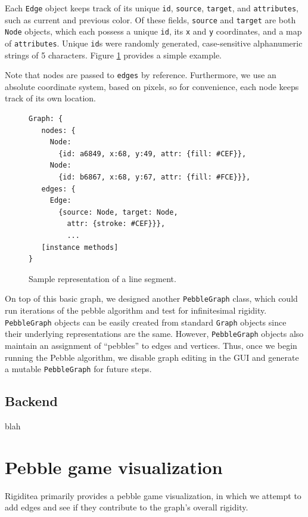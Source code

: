 \documentclass[aps,prd,final,twocolumn,letterpaper,nofootinbib]{revtex4-1}
\begin{document}
Each \texttt{Edge} object keeps track of its unique \texttt{id}, \texttt{source}, \texttt{target}, and \texttt{attributes},
such as current and previous color.
Of these fields, \texttt{source} and \texttt{target} are both \texttt{Node} objects,
which each possess a unique \texttt{id}, its \texttt{x} and \texttt{y} coordinates,
and a map of \texttt{attributes}.
Unique \texttt{id}s were randomly generated,
case-sensitive alphanumeric strings of 5 characters.
Figure \ref{fig:graphrep} provides a simple example.

Note that nodes are passed to \texttt{edges} by reference.
Furthermore, we use an absolute coordinate system,
based on pixels, so for convenience, each node keeps track of its own location.

\begin{figure}[ht]
\begin{verbatim}
Graph: {
   nodes: {
     Node:
       {id: a6849, x:68, y:49, attr: {fill: #CEF}},
     Node:
       {id: b6867, x:68, y:67, attr: {fill: #FCE}}},
   edges: {
     Edge:
       {source: Node, target: Node,
         attr: {stroke: #CEF}}},
         ...
   [instance methods]
}
\end{verbatim}
\caption{Sample representation of a line segment.}
\label{fig:graphrep}
\end{figure}

On top of this basic graph,
we designed another \texttt{PebbleGraph} class,
which could run iterations of the pebble algorithm
and test for infinitesimal rigidity.
\texttt{PebbleGraph} objects can be easily created
from standard \texttt{Graph} objects since
their underlying representations are the same.
However, \texttt{PebbleGraph} objects also maintain
an assignment of ``pebbles'' to edges and vertices.
Thus, once we begin running the Pebble algorithm,
we disable graph editing in the GUI and generate a mutable \texttt{PebbleGraph}
for future steps.
 
\subsection{Backend}
blah

\section{Pebble game visualization}
\label{sec:pebble}

Rigiditea primarily provides a pebble game visualization,
in which we attempt to add edges and see if they contribute
to the graph's overall rigidity.
\end{document}
